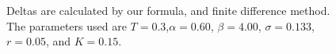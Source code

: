 

\begin{figure}[!tbp]
    \centering
    \hfill
    \caption{Deltas are calculated by our formula, and finite difference method. The parameters used are $T=0.3$,$\alpha = 0.60$, $\beta = 4.00$, $\sigma = 0.133$, $r = 0.05$, and $K= 0.15$.  }
  \end{figure}


